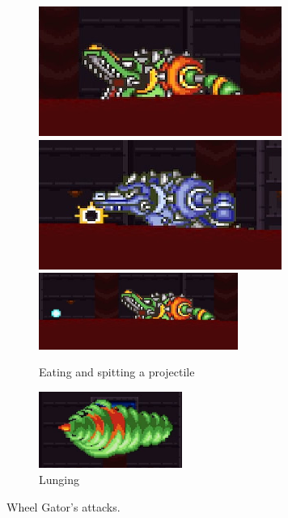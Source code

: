\begin{figure}
	\ContinuedFloat
	\centering
	\begin{subfigure}{\linewidth}
		\centering
		\includegraphics[width=0.45\linewidth]{figures/X2/Wheel_gator/Gator_mouth.png}
		\includegraphics[width=0.45\linewidth]{figures/X2/Wheel_gator/Gator_absorb.png}
		\vspace{1pt}\\
		\includegraphics[height=2.5cm]{figures/X2/Wheel_gator/Gator_spit.png}
		\caption{Eating and spitting a projectile}
	\end{subfigure}
	\begin{subfigure}{0.8\linewidth}
		\centering
		\includegraphics[height=2.5cm]{figures/X2/Wheel_gator/Gator_DM.png}
		\caption{Lunging}
	\end{subfigure}
	\caption{Wheel Gator's attacks.}	
\end{figure}

